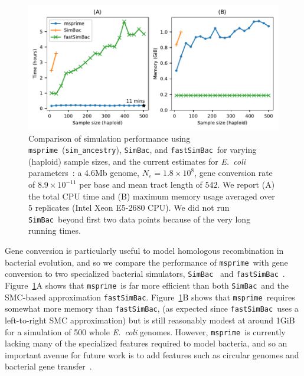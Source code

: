 \documentclass[9pt,twocolumn,twoside,lineno]{gsajnl}
\newcommand{\msprime}[0]{\texttt{msprime}}
\newcommand{\SimBac}[0]{\texttt{SimBac}}
\newcommand{\FastSimBac}[0]{\texttt{fastSimBac}}
\begin{document}
\begin{figure}
\begin{center}
\includegraphics{figures/gc-perf}
\end{center}
\caption{\label{fig-gc-perf}Comparison of simulation performance
using \msprime\ (\texttt{sim\_ancestry}), \SimBac, and \FastSimBac\ for varying
(haploid) sample sizes,
and the current estimates
for \textit{E.~coli} parameters~\citep{lapierre2016the}:
a 4.6Mb genome, $N_e = 1.8\times 10^8$, gene conversion rate of $8.9\times 10^{-11}$
per base and mean tract length of $542$.
We report (A) the total CPU time and (B) maximum memory usage
averaged over 5 replicates (Intel Xeon E5-2680 CPU).
We did not run \SimBac\ beyond first two data points because
of the very long running times.}
\end{figure}

Gene conversion is particularly useful to model homologous recombination in
bacterial evolution,
and so we compare the performance of \msprime\ with gene conversion to
two specialized bacterial simulators,
\SimBac~\citep{brown2016simbac} and \FastSimBac~\citep{demaio2017the}.
Figure~\ref{fig-gc-perf}A shows that \msprime\ is far more efficient than
both \SimBac\ and the SMC-based approximation \FastSimBac.
Figure~\ref{fig-gc-perf}B shows that \msprime\ requires somewhat more memory
than \FastSimBac, (as expected since \FastSimBac\ uses a left-to-right
SMC approximation) but is still reasonably modest at around 1GiB for a simulation
of 500 whole \emph{E.~coli} genomes.
However, \msprime\ is currently lacking many of the specialized features
required to model bacteria, and so an important avenue for future work
is to add features such as circular genomes
and bacterial gene transfer~\citep{baumdicker2014AGTG}.
\end{document}
